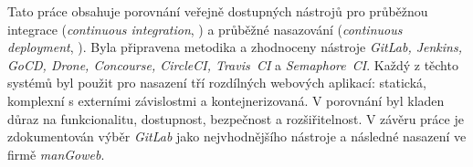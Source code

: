 Tato práce obsahuje porovnání veřejně dostupných nástrojů pro průběžnou integrace (\textit{continuous integration}, \CI) a průběžné nasazování (\textit{continuous deployment}, \CD). Byla připravena metodika a zhodnoceny nástroje \textit{GitLab, Jenkins, GoCD, Drone, Concourse, CircleCI, Travis~CI} a \textit{Semaphore~CI}. Každý z těchto systémů byl použit pro nasazení tří rozdílných webových aplikací: statická, komplexní s externími závislostmi a kontejnerizovaná. V porovnání byl kladen důraz na funkcionalitu, dostupnost, bezpečnost a rozšiřitelnost. V závěru práce je zdokumentován výběr \textit{GitLab} jako nejvhodnějšího nástroje a následné nasazení \CICD ve firmě \textit{manGoweb}.
